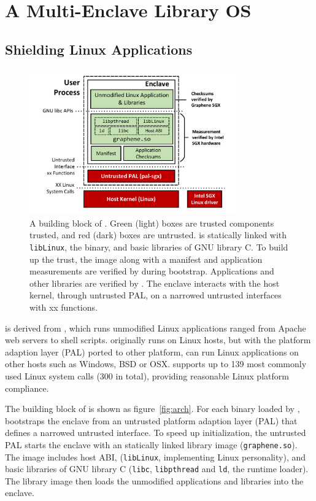 \section{A Multi-Enclave Library OS}

\subsection{Shielding Linux Applications}
\label{sec:gsgx:background:graphene}

\begin{figure}[t!]
\centering
\includegraphics[width=3.5in]{graphene-sgx/figures/architecture.pdf}
\vspace{-0.1in}
\footnotesize
\caption[\sysname{}: a building block.]
{A building block of \sysname{}.
Green (light) boxes are trusted components trusted,
and red (dark) boxes are untrusted.
\sysname{} is statically linked with {\tt libLinux},
the \libos{} binary, and basic libraries of GNU library C.
To build up the trust, the \sysname{} image along with
a manifest and application measurements
are verified by \sgx{} during bootstrap. Applications and other libraries
are verified by \sysname{}. The enclave interacts with the host kernel,
through untrusted PAL, on a narrowed untrusted interfaces with xx functions.
}
\label{fig:gsgx:arch}
\end{figure}

\sysname{} is derived from \graphene{} \libos{}, which runs unmodified
Linux applications ranged from Apache web servers to shell scripts.
\graphene{} \libos{} originally runs on Linux hosts, but with the platform
adaption layer (PAL) ported to other platform,
\graphene{} can run Linux applications on other hosts such as
Windows, BSD or OSX.
\graphene{} supports up to 139 most commonly used Linux system calls
(300 in total),
providing reasonable Linux platform compliance.

The building block of \sysname{} is shown as figure~\ref{fig:arch}.
For each binary loaded by \sysname{}, \sysname{} bootstraps the enclave
from an untrusted platform adaption layer (PAL) that defines
a narrowed untrusted interface.
To speed up initialization, the untrusted PAL starts the enclave
with an statically linked library image ({\tt graphene.so}).
The image includes
\graphene{} host ABI,
\libos{} ({\tt libLinux}, implementing Linux personality),
and basic libraries of GNU library C
({\tt libc}, {\tt libpthread} and {\tt ld}, the runtime loader).
The \sysname{} library image then loads the unmodified applications
and libraries into the enclave.

